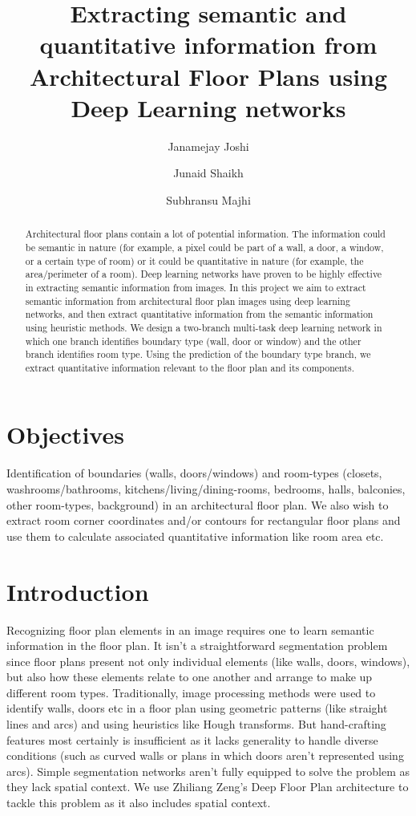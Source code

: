 \documentclass[a4paper]{article}
\title{Extracting semantic and quantitative information from Architectural Floor Plans using Deep Learning networks}
\author{Janamejay Joshi}
\author{Junaid Shaikh}
\author{Subhransu Majhi}
\affil{Center for Computational Technologies, Pune}
\begin{document}
\maketitle


\begin{abstract}
Architectural floor plans contain a lot of potential information. The information could be semantic in nature (for example, a pixel could be part of a wall, a door, a window, or a certain type of room) or it could be quantitative in nature (for example, the area/perimeter of a room). Deep learning networks have proven to be highly effective in extracting semantic information from images. In this project we aim to extract semantic information from architectural floor plan images using deep learning networks, and then extract quantitative information from the semantic information using heuristic methods. We design a two-branch multi-task deep learning network in which one branch identifies boundary type (wall, door or window) and the other branch identifies room type. Using the prediction of the boundary type branch, we extract quantitative information relevant to the floor plan and its components.
\end{abstract}


\section{Objectives}
Identification of boundaries (walls, doors/windows) and room-types (closets, washrooms/bathrooms, kitchens/living/dining-rooms, bedrooms, halls, balconies, other room-types, background) in an architectural floor plan. We also wish to extract room corner coordinates and/or contours for rectangular floor plans and use them to calculate associated quantitative information like room area etc.


\section{Introduction}
Recognizing floor plan elements in an image requires one to learn semantic information in the floor plan. It isn't a straightforward segmentation problem since floor plans present not only individual elements (like walls, doors, windows), but also how these elements relate to one another and arrange to make up different room types. Traditionally, image processing methods were used to identify walls, doors etc in a floor plan using geometric patterns (like straight lines and arcs) and using heuristics like Hough transforms. But hand-crafting features most certainly is insufficient as it lacks generality to handle diverse conditions (such as curved walls or plans in which doors aren't represented using arcs). Simple segmentation networks aren't fully equipped to solve the problem as they lack spatial context. We use Zhiliang Zeng's\cite{zengpaper} Deep Floor Plan architecture to tackle this problem as it also includes spatial context.
\end{document}
